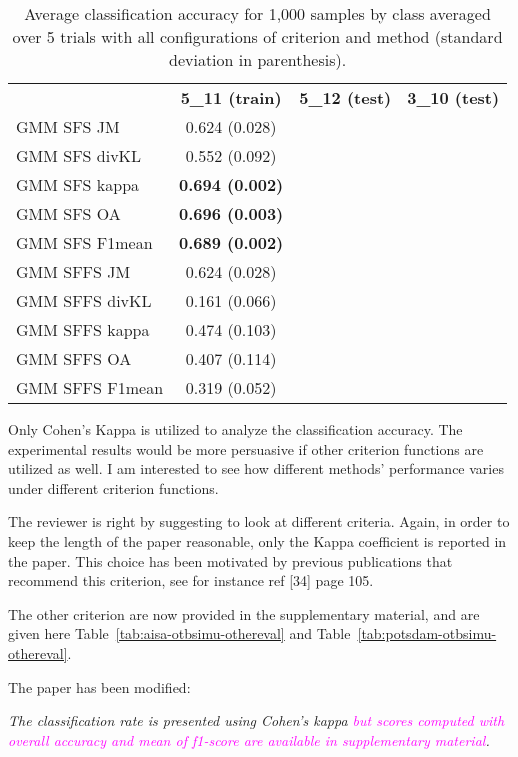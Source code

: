 \documentclass[a4paper,10pt,DIV=16]{scrartcl}
\newcommand{\rev}[1]{\textcolor{magenta}{#1}}
\begin{document}
    \begin{table}[!t]
        \centering
        \caption{Average classification accuracy for 1,000 samples by class averaged over 5 trials  with all configurations of criterion and method (standard deviation in parenthesis).\label{tab:potsdam-otbsimu-all}}
        \begin{tabular}{lccc}\toprule
            & {\bfseries 5\_11 (train)} & {\bfseries 5\_12 (test)} & {\bfseries 3\_10 (test)} \\ \cmidrule{2-4}
            GMM SFS JM &      0.624 (0.028) & & \\
            GMM SFS divKL &   0.552 (0.092) & & \\
            GMM SFS kappa &   {\bfseries 0.694 (0.002)} & & \\
            GMM SFS OA &      {\bfseries 0.696 (0.003)} & & \\
            GMM SFS F1mean &  {\bfseries 0.689 (0.002)} & & \\
            GMM SFFS JM &     0.624 (0.028) & & \\
            GMM SFFS divKL &  0.161 (0.066) & & \\
            GMM SFFS kappa &  0.474 (0.103) & & \\
            GMM SFFS OA &     0.407 (0.114) & & \\
            GMM SFFS F1mean & 0.319 (0.052) & & \\
            \bottomrule
        \end{tabular}
    \end{table}
















\begin{revbox}
  Only Cohen’s Kappa is utilized to analyze the classification accuracy. The experimental results would be more persuasive if other criterion functions are utilized as well. I am interested to see how different methods’ performance varies under different criterion functions.
  \begin{resbox}
    The reviewer is right by suggesting to look at different criteria. Again, in order to keep the length of the paper reasonable, only the Kappa coefficient is reported in the paper. This choice has been motivated by previous publications that recommend this criterion, see for instance ref [34] page 105.

    The other criterion are now provided in the supplementary material, and are given here Table~\ref{tab:aisa-otbsimu-othereval} and  Table~\ref{tab:potsdam-otbsimu-othereval}.

    The paper has been modified:

    \emph{The    classification   rate    is    presented   using    Cohen's kappa \rev{but scores computed with overall accuracy and mean of f1-score are available in supplementary material}.}
  \end{resbox}
\end{revbox}
\end{document}
